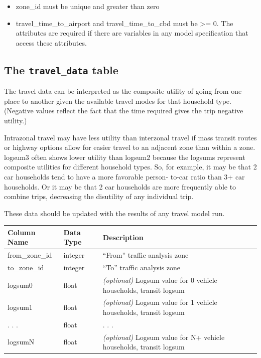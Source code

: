 \begin{itemize} \tight
\item zone_id must be unique and greater than zero
\item travel_time_to_airport and travel_time_to_cbd must be \textgreater{}= 0. The 
attributes are required if there are variables in any model specification that access
these attributes. 
\end{itemize}



\subsection{The {\tt travel_data} table}

The travel data can be interpreted as the composite utility of going from one
place to another given the available travel modes for that household type.
(Negative values reflect the fact that the time required gives the trip
negative utility.)


Intrazonal travel may have less utility than interzonal travel if
mass transit routes or highway options allow for easier travel to an
adjacent zone than within a zone. logsum3 often shows lower utility
than logsum2 because the logsums represent composite utilities for
different household types. So, for example, it may be that 2 car
households tend to have a more favorable person- to-car ratio than
3+ car households. Or it may be that 2 car households are more
frequently able to combine trips, decreasing the disutility of any
individual trip.

These data should be updated with the results of any travel model run.


\begin{tabular}{llp{4in}}
\textbf{Column Name} & \textbf{Data Type} & \textbf{Description} \\
\hline
from_zone_id & integer &  ``From'' traffic analysis zone   \\
\hline
to_zone_id & integer &  ``To'' traffic analysis zone   \\
\hline
logsum0 & float & \emph{(optional) }
Logsum value for 0 vehicle households, transit logsum  \\
\hline
logsum1 & float & \emph{(optional) }
Logsum value for 1 vehicle households, transit logsum  \\
\hline
. . . & float &
. . .  \\
\hline
logsumN & float & \emph{(optional) }
Logsum value for N+ vehicle households, transit logsum  \\
\hline

\end{tabular}

